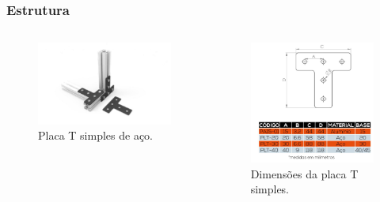 \begin{frame}
\frametitle{Estrutura}

\begin{columns}
    \begin{figure}
        \centering
        \includegraphics[scale = 0.14]{figuras/placatp}
        \caption{Placa T simples de aço.}
    \end{figure}            
    \begin{figure}
        \centering
        \includegraphics[scale = 0.12]{figuras/placatd}
        \caption{Dimensões da placa T simples.}
    \end{figure}            
\end{columns}    

\end{frame}

